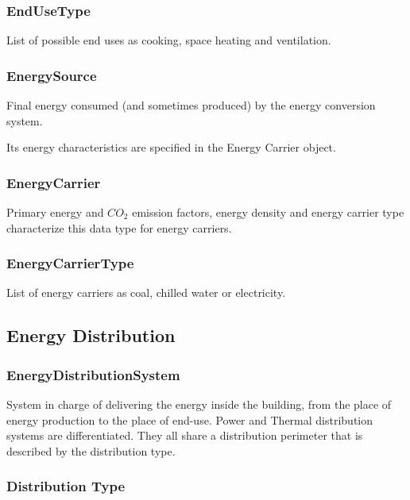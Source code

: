 \documentclass[a4paper,12pt]{article}
\begin{document}
\subsubsection{EndUseType}\label{endusetype}

List of possible end uses as cooking, space heating and ventilation.

\subsubsection{EnergySource}\label{energysource}

Final energy consumed (and sometimes produced) by the energy conversion
system.

Its energy characteristics are specified in the Energy Carrier object.

\subsubsection{EnergyCarrier}\label{energycarrier}

Primary energy and \(CO_2\) emission factors, energy density and energy
carrier type characterize this data type for energy carriers.

\subsubsection{EnergyCarrierType}\label{energycarriertype}

List of energy carriers as coal, chilled water or electricity.

\subsection{Energy Distribution}\label{energy-distribution}

\subsubsection{EnergyDistributionSystem}\label{energydistributionsystem}

System in charge of delivering the energy inside the building, from the
place of energy production to the place of end-use. Power and Thermal
distribution systems are differentiated. They all share a distribution
perimeter that is described by the distribution type.

\subsubsection{Distribution Type}\label{distribution-type}
\end{document}
